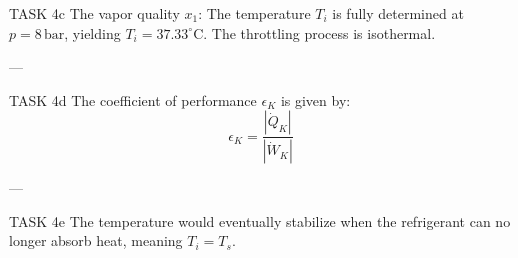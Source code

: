 TASK 4c  
The vapor quality \( x_1 \):  
The temperature \( T_i \) is fully determined at \( p = 8 \, \text{bar} \), yielding \( T_i = 37.33^\circ\text{C} \).  
The throttling process is isothermal.

---

TASK 4d  
The coefficient of performance \( \epsilon_K \) is given by:  
\[
\epsilon_K = \frac{|\dot{Q}_K|}{|\dot{W}_K|}
\]

---

TASK 4e  
The temperature would eventually stabilize when the refrigerant can no longer absorb heat, meaning \( T_i = T_s \).